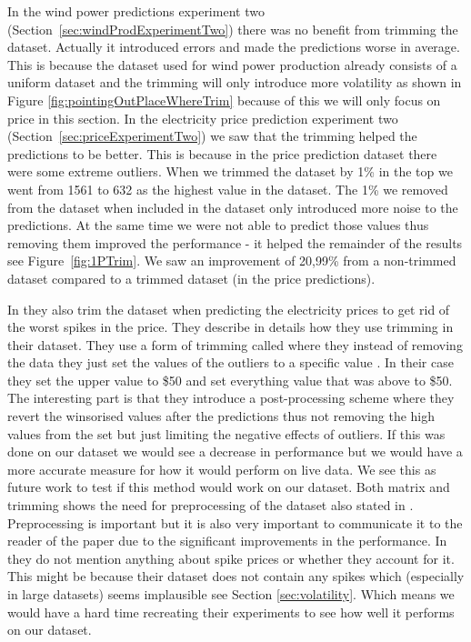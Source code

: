 In the wind power predictions experiment two (Section~\ref{sec:windProdExperimentTwo}) there was no benefit from trimming the dataset. Actually it introduced errors and made the predictions worse in average. This is because the dataset used for wind power production already consists of a uniform dataset and the trimming will only introduce more volatility as shown in Figure \ref{fig:pointingOutPlaceWhereTrim} because of this we will only focus on price in this section. In the electricity price prediction experiment two (Section~\ref{sec:priceExperimentTwo}) we saw that the trimming helped the predictions to be better. This is because in the price prediction dataset there were some extreme outliers. When we trimmed the dataset by 1\% in the top we went from 1561 to 632 as the highest value in the dataset. The 1\% we removed from the dataset when included in the dataset only introduced more noise to the predictions. At the same time we were not able to predict those values thus removing them improved the performance - it helped the remainder of the results see Figure~\ref{fig:1PTrim}. We saw an improvement of 20,99\% from a non-trimmed dataset compared to a trimmed dataset (in the price predictions).

In \cite{singhal2011electricity, yamin2004adaptive} they also trim the dataset when predicting the electricity prices to get rid of the worst spikes in the price. They describe in details how they use trimming in their dataset. They use a form of trimming called  where they instead of removing the data they just set the values of the outliers to a specific value \cite{yamin2004adaptive}. In their case they set the upper value to \$50 and set everything value that was above to \$50. The interesting part is that they introduce a post-processing scheme where they revert the winsorised values after the predictions thus not removing the high values from the set but just limiting the negative effects of outliers. If this was done on our dataset we would see a decrease in performance\cite{yamin2004adaptive} but we would have a more accurate measure for how it would perform on live data. We see this as future work to test if this method would work on our dataset. Both matrix and trimming shows the need for preprocessing of the dataset also stated in \cite{yamin2004adaptive}. Preprocessing is important but it is also very important to communicate it to the reader of the paper due to the significant improvements in the performance. In \cite{sansom1999neural, 1} they do not mention anything about spike prices or whether they account for it. This might be because their dataset does not contain any spikes which (especially in large datasets) seems implausible see Section \ref{sec:volatility}. Which means we would have a hard time recreating their experiments to see how well it performs on our dataset.

